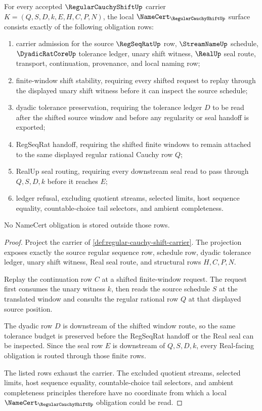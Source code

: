 \begin{theorem}
\label{thm:regular-cauchy-shift-namecert-obligations}
For every accepted $\RegularCauchyShiftUp$ carrier $K=(Q,S,D,k,E,H,C,P,N)$, the local $\NameCert_{\RegularCauchyShiftUp}$ surface consists exactly of the following obligation rows:
\begin{enumerate}
\item carrier admission for the source $\RegSeqRatUp$ row, $\StreamNameUp$ schedule, $\DyadicRatCoreUp$ tolerance ledger, unary shift witness, $\RealUp$ seal route, transport, continuation, provenance, and local naming row;
\item finite-window shift stability, requiring every shifted request to replay through the displayed unary shift witness before it can inspect the source schedule;
\item dyadic tolerance preservation, requiring the tolerance ledger $D$ to be read after the shifted source window and before any regularity or seal handoff is exported;
\item RegSeqRat handoff, requiring the shifted finite windows to remain attached to the same displayed regular rational Cauchy row $Q$;
\item RealUp seal routing, requiring every downstream seal read to pass through $Q,S,D,k$ before it reaches $E$;
\item ledger refusal, excluding quotient streams, selected limits, host sequence equality, countable-choice tail selectors, and ambient completeness.
\end{enumerate}
No NameCert obligation is stored outside those rows.
\end{theorem}
\begin{proof}
Project the carrier of \autoref{def:regular-cauchy-shift-carrier}. The projection exposes exactly the source regular sequence row, schedule row, dyadic tolerance ledger, unary shift witness, Real seal route, and structural rows $H,C,P,N$.

Replay the continuation row $C$ at a shifted finite-window request. The request first consumes the unary witness $k$, then reads the source schedule $S$ at the translated window and consults the regular rational row $Q$ at that displayed source position.

The dyadic row $D$ is downstream of the shifted window route, so the same tolerance budget is preserved before the RegSeqRat handoff or the Real seal can be inspected. Since the seal row $E$ is downstream of $Q,S,D,k$, every Real-facing obligation is routed through those finite rows.

The listed rows exhaust the carrier. The excluded quotient streams, selected limits, host sequence equality, countable-choice tail selectors, and ambient completeness principles therefore have no coordinate from which a local $\NameCert_{\RegularCauchyShiftUp}$ obligation could be read.
\end{proof}

